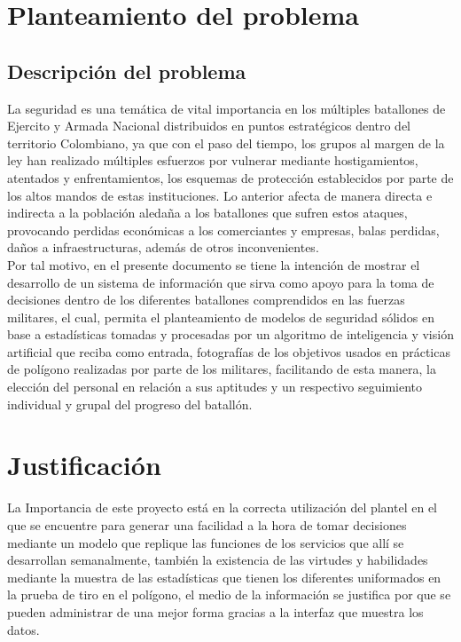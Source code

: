 \documentclass[conference]{IEEEtran}
\begin{document}
\section{Planteamiento del problema}

\subsection{Descripción del problema}
La seguridad es una temática de vital importancia en los múltiples batallones de Ejercito y Armada Nacional distribuidos en puntos estratégicos dentro del territorio Colombiano, ya que con el paso del tiempo, los grupos al margen de la ley han realizado múltiples esfuerzos por vulnerar mediante hostigamientos, atentados y enfrentamientos, los esquemas de protección establecidos por parte de los altos mandos de estas instituciones. Lo anterior afecta de manera directa e indirecta a la población aledaña a los batallones que sufren estos ataques, provocando perdidas económicas a los comerciantes y empresas, balas perdidas, daños a infraestructuras, además de otros inconvenientes.\\
Por tal motivo, en el presente documento se tiene la intención de mostrar el desarrollo de un sistema de información que sirva como apoyo para la toma de decisiones dentro de los diferentes batallones comprendidos en las fuerzas militares, el cual, permita el planteamiento de modelos de seguridad sólidos en base a estadísticas tomadas y procesadas por un algoritmo de inteligencia y visión artificial que reciba como entrada, fotografías de los objetivos usados en prácticas de polígono realizadas por parte de los militares, facilitando de esta manera,  la elección del personal en relación a sus aptitudes y un respectivo seguimiento individual y grupal del progreso del batallón.

\section{Justificación}
La Importancia de este proyecto está en la correcta utilización del plantel en el que se encuentre para generar una facilidad a la hora de tomar decisiones mediante un modelo que replique las funciones de los servicios que allí se desarrollan semanalmente, también la existencia de las virtudes y habilidades mediante la muestra de las estadísticas que tienen los diferentes uniformados en la prueba de tiro en el polígono, el medio de la información se justifica por que se pueden administrar de una mejor forma gracias a la interfaz que muestra los datos.
\end{document}
